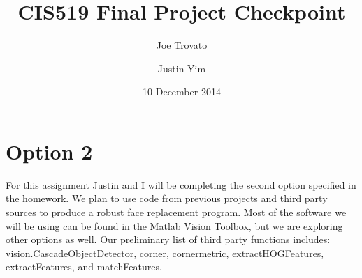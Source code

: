 \documentclass[10pt, twocolumn]{article}
\begin{document}
\title{CIS519 Final Project Checkpoint\vspace{-2ex}}
\author{Joe Trovato \and Justin Yim\vspace{-2ex}}
\date{10 December 2014\vspace{-2ex}}
\maketitle

\section{Option 2}
For this assignment Justin and I will be completing the second option specified in the homework. We plan to use code from previous projects and third party sources to produce a robust face replacement program. Most of the software we will be using can be found in the Matlab Vision Toolbox, but we are exploring other options as well. Our preliminary list of third party functions includes: vision.CascadeObjectDetector, corner, cornermetric, extractHOGFeatures, extractFeatures, and matchFeatures.
\end{document}
